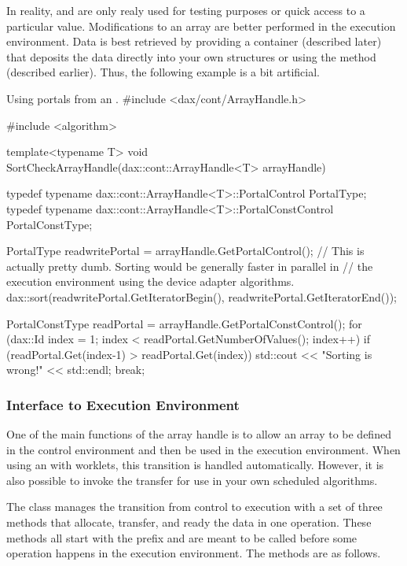 In reality,  and
 are only realy used for testing purposes
or quick access to a particular value. Modifications to an array are better
performed in the execution environment. Data is best retrieved by providing
a container (described later) that deposits the data directly into your own
structures or using the  method (described
earlier). Thus, the following example is a bit artificial.

\begin{daxexample}{Using portals from an .}
#include <dax/cont/ArrayHandle.h>

#include <algorithm>

template<typename T>
void SortCheckArrayHandle(dax::cont::ArrayHandle<T> arrayHandle)
{
  typedef typename dax::cont::ArrayHandle<T>::PortalControl PortalType;
  typedef typename dax::cont::ArrayHandle<T>::PortalConstControl PortalConstType;

  PortalType readwritePortal = arrayHandle.GetPortalControl();
  // This is actually pretty dumb. Sorting would be generally faster in parallel in
  // the execution environment using the device adapter algorithms.
  dax::sort(readwritePortal.GetIteratorBegin(), readwritePortal.GetIteratorEnd());

  PortalConstType readPortal = arrayHandle.GetPortalConstControl();
  for (dax::Id index = 1; index < readPortal.GetNumberOfValues(); index++)
    {
    if (readPortal.Get(index-1) > readPortal.Get(index))
      {
      std::cout << "Sorting is wrong!" << std::endl;
      break;
      }
    }
}
\end{daxexample}


\subsubsection{Interface to Execution Environment}
\label{sec:ArrayHandleInterfaceToExecutionEnvironment}

One of the main functions of the array handle is to allow an array to be
defined in the control environment and then be used in the execution
environment. When using an  with worklets, this
transition is handled automatically. However, it is also possible to invoke
the transfer for use in your own scheduled algorithms.

The  class manages the transition from control
to execution with a set of three methods that allocate, transfer, and ready
the data in one operation. These methods all start with the prefix
 and are meant to be called before some operation happens
in the execution environment. The methods are as follows.


